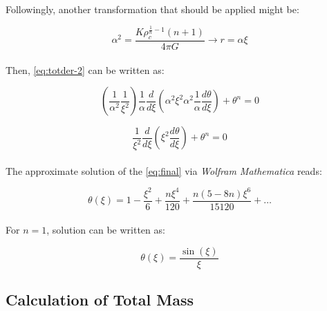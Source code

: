 \documentclass[letterpaper,12pt]{article}
\begin{document}
\paragraph{} Followingly, another transformation that should be applied might be:

\begin{equation}
    \label{eq:alpha}
    \alpha^2 = \frac{K \rho_c^{\frac{1}{n}-1} \left(n+1\right)}{4 \pi G} \rightarrow r = \alpha \xi
\end{equation}

\paragraph{} Then, \eqref{eq:totder-2} can be written as:

\begin{equation*}
    \left(\frac{1}{\alpha^2}\frac{1}{\xi^2}\right)\frac{1}{\alpha}\frac{d}{d\xi}\left(\alpha^2\xi^2\alpha^2\frac{1}{\alpha}\frac{d\theta}{d\xi}\right) + \theta^n = 0
\end{equation*}

\begin{equation}
    \label{eq:final}
   \frac{1}{\xi^2}\frac{d}{d\xi}\left(\xi^2\frac{d\theta}{d\xi}\right) + \theta^n = 0
\end{equation}

\paragraph{} The approximate solution of the \eqref{eq:final} via \textit{Wolfram Mathematica} reads:

\begin{equation*}  
      \theta(\xi) =  1-\frac{\xi ^2}{6}+\frac{n \xi ^4}{120}+\frac{n (5-8 n) \xi ^6}{15120}+\dots
\end{equation*}

\paragraph{} For $n = 1$, solution can be written as:

\begin{equation*}
    \theta(\xi) =  \frac{\sin (\xi )}{\xi }
\end{equation*}

\subsection{Calculation of Total Mass}
\end{document}
